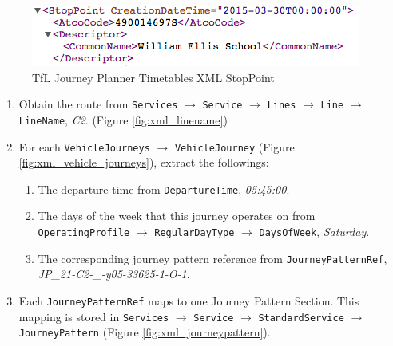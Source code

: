\begin{figure}
\centering
\includegraphics[width=\textwidth]{figures/xml_stoppoint.png}
\caption{\label{fig:xml_stoppoint} TfL Journey Planner Timetables XML StopPoint}
\end{figure}

\begin{enumerate}
  \item Obtain the route from \texttt{Services} $\rightarrow$ \texttt{Service} $\rightarrow$ \texttt{Lines} $\rightarrow$ \texttt{Line} $\rightarrow$ \texttt{LineName}, \textit{C2}. (Figure \ref{fig:xml_linename})
  \item For each \texttt{VehicleJourneys} $\rightarrow$ \texttt{VehicleJourney} (Figure \ref{fig:xml_vehicle_journeys}), extract the followings:
  \begin{enumerate}
    \item The departure time from \texttt{DepartureTime}, \textit{05:45:00}.
    \item The days of the week that this journey operates on from \texttt{OperatingProfile} $\rightarrow$ \texttt{RegularDayType} $\rightarrow$ \texttt{DaysOfWeek}, \textit{Saturday}.
    \item The corresponding journey pattern reference from \texttt{JourneyPatternRef}, \textit{JP\_21-C2-\_-y05-33625-1-O-1}.
  \end{enumerate}
  \item Each \texttt{JourneyPatternRef} maps to one Journey Pattern Section. This mapping is stored in \texttt{Services} $\rightarrow$ \texttt{Service} $\rightarrow$ \texttt{StandardService} $\rightarrow$ \texttt{JourneyPattern} (Figure \ref{fig:xml_journeypattern}).


\end{enumerate}
